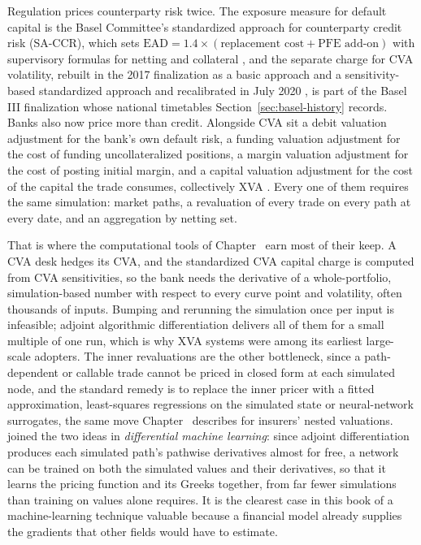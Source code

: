 \documentclass[../ai_in_finance]{subfiles}
\begin{document}
Regulation prices counterparty risk twice. The exposure measure for default capital is the Basel Committee's standardized approach for counterparty credit risk (SA-CCR), which sets $\text{EAD} = 1.4 \times (\text{replacement cost} + \text{PFE add-on})$ with supervisory formulas for netting and collateral \parencite{bcbs2014saccr}, and the separate charge for CVA volatility, rebuilt in the 2017 finalization as a basic approach and a sensitivity-based standardized approach and recalibrated in July 2020 \parencite{bcbs2020cva}, is part of the Basel III finalization whose national timetables Section~\ref{sec:basel-history} records. Banks also now price more than credit. Alongside CVA sit a debit valuation adjustment for the bank's own default risk, a funding valuation adjustment for the cost of funding uncollateralized positions, a margin valuation adjustment for the cost of posting initial margin, and a capital valuation adjustment for the cost of the capital the trade consumes, collectively XVA \parencite{gregory2020xva}. Every one of them requires the same simulation: market paths, a revaluation of every trade on every path at every date, and an aggregation by netting set.

That is where the computational tools of Chapter~ earn most of their keep. A CVA desk hedges its CVA, and the standardized CVA capital charge is computed from CVA sensitivities, so the bank needs the derivative of a whole-portfolio, simulation-based number with respect to every curve point and volatility, often thousands of inputs. Bumping and rerunning the simulation once per input is infeasible; adjoint algorithmic differentiation delivers all of them for a small multiple of one run, which is why XVA systems were among its earliest large-scale adopters. The inner revaluations are the other bottleneck, since a path-dependent or callable trade cannot be priced in closed form at each simulated node, and the standard remedy is to replace the inner pricer with a fitted approximation, least-squares regressions on the simulated state or neural-network surrogates, the same move Chapter~ describes for insurers' nested valuations. \textcite{huge2020differential} joined the two ideas in \emph{differential machine learning}: since adjoint differentiation produces each simulated path's pathwise derivatives almost for free, a network can be trained on both the simulated values and their derivatives, so that it learns the pricing function and its Greeks together, from far fewer simulations than training on values alone requires. It is the clearest case in this book of a machine-learning technique valuable because a financial model already supplies the gradients that other fields would have to estimate.
\end{document}
